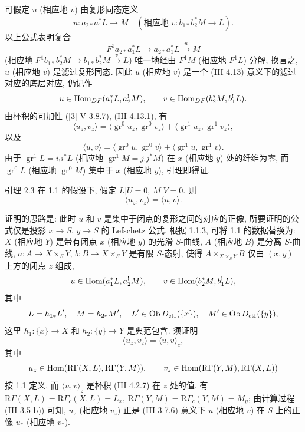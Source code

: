可假定 $u$ (相应地 $v$) 由复形同态定义
\[
u:a_{2*}a_1^*L\longrightarrow M
\quad
(\text{相应地 }v:b_{1*}b_2^*M\longrightarrow L).
\]
以上公式表明复合
\[
F^1a_{2*}a_1^*L\longrightarrow a_{2*}a_1^*L\xrightarrow{u}M
\]
(相应地 $F^1b_{1*}b_2^*M\to b_{1*}b_2^*M\xrightarrow{v}L$) 唯一地经由 $F^1M$ (相应地 $F^1L$) 分解; 换言之, $u$ (相应地 $v$) 是滤过复形同态. 因此 $u$ (相应地 $v$) 是一个 (III 4.13) 意义下的滤过对应的底层对应, 仍记作
\[
u\in\operatorname{Hom}_{DF}(a_1^*L,a_2^!M),\qquad
v\in\operatorname{Hom}_{DF}(b_2^*M,b_1^!L).
\]
由杯积的可加性 ([3] V 3.8.7), (III 4.13.1), 有
\[
\langle u_z,v_z\rangle
 =\langle \operatorname{gr}^0u_z,\operatorname{gr}^0v_z\rangle
 +\langle \operatorname{gr}^1u_z,\operatorname{gr}^1v_z\rangle,
\]
以及
\[
\langle u,v\rangle
 =\langle \operatorname{gr}^0u,\operatorname{gr}^0v\rangle
 +\langle \operatorname{gr}^1u,\operatorname{gr}^1v\rangle.
\]
由于 $\operatorname{gr}^1L=i_!i^*L$ (相应地 $\operatorname{gr}^1M=j_!j^*M$) 在 $x$ (相应地 $y$) 处的纤维为零, 而 $\operatorname{gr}^0L$ (相应地 $\operatorname{gr}^0M$) 集中于 $x$ (相应地 $y$), 引理即得证.

\begin{statement}{引理 2.3}
在 1.1 的假设下, 假定 $L|U=0$, $M|V=0$. 则
\[
\langle u_z,v_z\rangle=\langle u,v\rangle .
\]
\end{statement}

证明的思路是: 此时 $u$ 和 $v$ 是集中于闭点的复形之间的对应的正像, 所要证明的公式仅是投影 $x\to S$, $y\to S$ 的 Lefschetz 公式. 根据 1.1.3, 可将 1.1 的数据替换为: $X$ (相应地 $Y$) 是带有闭点 $x$ (相应地 $y$) 的光滑 $S$-曲线, $A$ (相应地 $B$) 是分离 $S$-曲线, $a:A\to X\times_S Y$, $b:B\to X\times_S Y$ 是有限 $S$-态射, 使得 $A\times_{X\times_SY}B$ 仅由 $(x,y)$ 上方的闭点 $z$ 组成,
\[
u\in\operatorname{Hom}(a_1^*L,a_2^!M),\qquad v\in\operatorname{Hom}(b_2^*M,b_1^!L),
\]
其中
\[
L=h_{1*}L',\quad M=h_{2*}M',\quad
L'\in\operatorname{Ob} D_{\mathrm{ctf}}(\{x\}),\quad M'\in\operatorname{Ob} D_{\mathrm{ctf}}(\{y\}),
\]
这里 $h_1:\{x\}\to X$ 和 $h_2:\{y\}\to Y$ 是典范包含. 须证明
\[
\langle u_z,v_z\rangle=\langle u,v\rangle_z,
\]
其中
\[
u_z\in\operatorname{Hom}(\mathrm R\Gamma(X,L),\mathrm R\Gamma(Y,M)),\qquad
v_z\in\operatorname{Hom}(\mathrm R\Gamma(Y,M),\mathrm R\Gamma(X,L))
\]
按 1.1 定义, 而 $\langle u,v\rangle_z$ 是杯积 (III 4.2.7) 在 $z$ 处的值. 有 $\mathrm R\Gamma(X,L)=\mathrm R\Gamma_c(X,L)=L_x$, $\mathrm R\Gamma(Y,M)=\mathrm R\Gamma_c(Y,M)=M_y$; 由计算过程 (III 3.5 b)) 可知, $u_z$ (相应地 $v_z$) 正是 (III 3.7.6) 意义下 $u$ (相应地 $v$) 在 $S$ 上的正像 $u_*$ (相应地 $v_*$).

